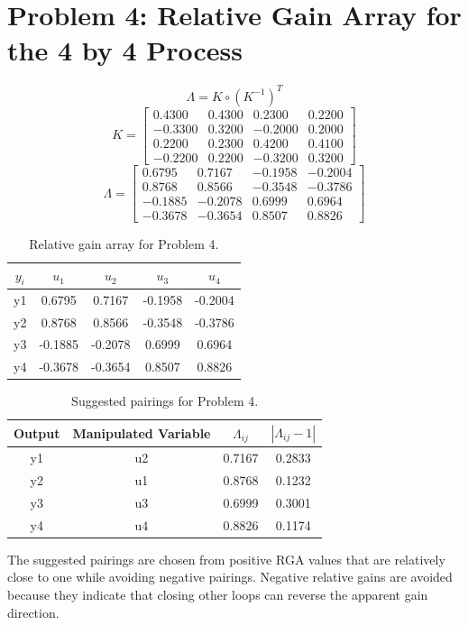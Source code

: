 \documentclass{article}%
\begin{document}
\section*{Problem 4: Relative Gain Array for the 4 by 4 Process}%
\label{sec:Problem4RelativeGainArrayforthe4by4Process}%
\[%
\Lambda = K \circ \left(K^{-1}\right)^T%
\]%
\[%
K = \begin{bmatrix} 0.4300 & 0.4300 & 0.2300 & 0.2200 \\ -0.3300 & 0.3200 & -0.2000 & 0.2000 \\ 0.2200 & 0.2300 & 0.4200 & 0.4100 \\ -0.2200 & 0.2200 & -0.3200 & 0.3200 \end{bmatrix}%
\]%
\[%
\Lambda = \begin{bmatrix} 0.6795 & 0.7167 & -0.1958 & -0.2004 \\ 0.8768 & 0.8566 & -0.3548 & -0.3786 \\ -0.1885 & -0.2078 & 0.6999 & 0.6964 \\ -0.3678 & -0.3654 & 0.8507 & 0.8826 \end{bmatrix}%
\]%
\begin{table}[H]%
\centering%
\begin{tabular}{ccccc}%
\hline%
$y_i$&$u_1$&$u_2$&$u_3$&$u_4$\\%
\hline%
y1&0.6795&0.7167&{-}0.1958&{-}0.2004\\%
\hline%
y2&0.8768&0.8566&{-}0.3548&{-}0.3786\\%
\hline%
y3&{-}0.1885&{-}0.2078&0.6999&0.6964\\%
\hline%
y4&{-}0.3678&{-}0.3654&0.8507&0.8826\\%
\hline%
\end{tabular}%
\caption{Relative gain array for Problem 4.}%
\label{tab:problem4_rga}%
\end{table}%
\begin{table}[H]%
\centering%
\begin{tabular}{cccc}%
\hline%
Output&Manipulated Variable&$\Lambda_{ij}$&$|\Lambda_{ij}-1|$\\%
\hline%
y1&u2&0.7167&0.2833\\%
\hline%
y2&u1&0.8768&0.1232\\%
\hline%
y3&u3&0.6999&0.3001\\%
\hline%
y4&u4&0.8826&0.1174\\%
\hline%
\end{tabular}%
\caption{Suggested pairings for Problem 4.}%
\label{tab:problem4_pairings}%
\end{table}%
The suggested pairings are chosen from positive RGA values that are relatively close to one while avoiding negative pairings. Negative relative gains are avoided because they indicate that closing other loops can reverse the apparent gain direction.%
\par
\end{document}
